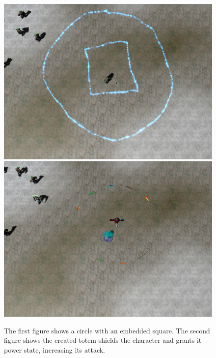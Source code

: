 \begin{figure}[p]
\centering
\includegraphics[width=.9\linewidth]{ext/scr/embsquare.png}
\quad
\includegraphics[width=.9\linewidth]{ext/scr/embsquaree.png}
\caption{The first figure shows a circle with an embedded square. The second figure shows the created totem shields the character and grants it power state, increasing its attack.}
\label{fig:spell:embsquare}
\end{figure}

